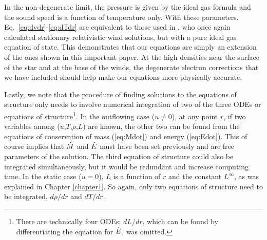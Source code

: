 \documentclass[../main.tex]{subfiles}
\begin{document}
In the non-degenerate limit, the pressure is given by the ideal gas formula and the sound speed is a function of temperature only. With these parameters, Eq.~\eqref{eq:dvdr}-\eqref{eq:dTdr} are equivalent to those used in \citet{Paczynski1986b}, who once again calculated stationary relativistic wind solutions, but with a pure ideal gas equation of state. This demonstrates that our equations are simply an extension of the ones shown in this important paper. At the high densities near the surface of the star and at the base of the winds, the degenerate electron corrections that we have included should help make our equations more physically accurate. 

Lastly, we note that the procedure of finding solutions to the equations of structure only needs to involve numerical integration of two of the three ODEs or equations of structure\footnote{There are technically four ODEs; $dL/dr$, which can be found by differentiating the equation for $\dot{E}$, was omitted.}. In the outflowing case ($u\neq 0$), at any point $r$, if two variables among ($u$,$T$,$\rho$,$L$) are known, the other two can be found from the equations of conservation of mass (\ref{eq:Mdot}) and energy (\ref{eq:Edot}). This of course implies that $\dot{M}$ and $\dot{E}$ must have been set previously and are free parameters of the solution. The third equation of structure could also be integrated simultaneously, but it would be redundant and increase computing time. In the static case ($u=0$), $L$ is a function of $r$ and the constant $L^\infty$, as was explained in Chapter \ref{chapter1}. So again, only two equations of structure need to be integrated, $d\rho/dr$ and $dT/dr$.

\biblio
\end{document}
